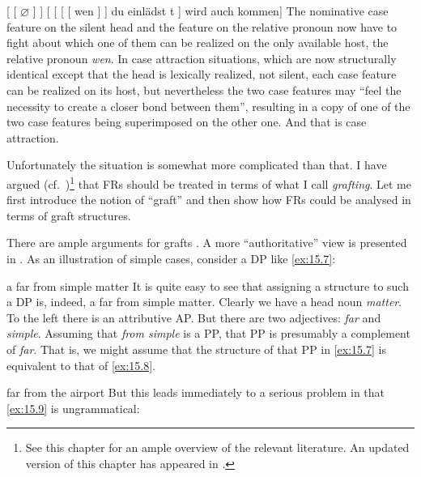 \documentclass[output=paper]{langsci/langscibook}
\begin{document}
\begin{refcontext}
\ea\label{ex:15.6}
    {}[ [ $\varnothing$ ]\tss{\Nom{}} ]  [ [
    [ [ wen ]\tss{\Acc{}} ]  du  einlädst  t ]  wird auch kommen]
\z
The nominative case feature on the silent head and the  feature
on the relative pronoun now have to fight about which one of them can be
realized on the only available host, the relative pronoun \emph{wen}. In case
attraction situations, which are now structurally identical except that the
head is lexically realized, not silent, each case feature can be realized on
its host, but nevertheless the two case features may “feel the necessity to
create a closer bond between them”, resulting in a copy of one of the two case
features being superimposed on the other one. And that is case attraction.

Unfortunately the situation is somewhat more complicated than that. I have
argued (cf.~\cite{VanRiemsdijk2006a})\footnote{See this chapter for an ample
overview of the relevant literature. An updated version of this chapter has
appeared in \textcite{VanRiemsdijk2017}.} that \glspl{FR} should be treated in
terms of what I call \emph{grafting}. Let me first introduce the notion of
\enquote{graft} and then show how \glspl{FR} could be analysed in terms of
graft structures.

There are ample arguments for grafts \parencite[cf.][]{VanRiemsdijk2000}. A
more \enquote{authoritative} view is presented in \citet{VanRiemsdijk2006b}. As
an illustration of simple cases, consider a DP like \eqref{ex:15.7}:

\ea\label{ex:15.7}
    a far from simple matter
\z
It is quite easy to see that assigning a structure to such a DP is, indeed, a
far from simple matter. Clearly we have a head noun \textit{matter}. To the left there
is an attributive AP\@. But there are two adjectives: \textit{far} and \textit{simple}.
Assuming that \textit{from simple} is a PP, that PP is presumably a complement of
\textit{far}. That is, we might assume that the structure of that PP in \eqref{ex:15.7} is
equivalent to that of \eqref{ex:15.8}.

\ea\label{ex:15.8}
    far from the airport
\z
But this leads immediately to a serious problem in that \eqref{ex:15.9} is ungrammatical:


\end{refcontext}
\end{document}
